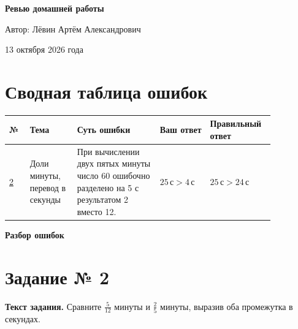 \documentclass[11pt,a4paper]{article}
\begin{document}
\thispagestyle{empty}
\vspace*{0.27\textheight}
\begin{center}
  {\Huge\bfseries Ревью домашней работы\par}
  \vspace{20mm}
  {\large Автор: Лёвин Артём Александрович\par}
  \vspace{6mm}
  {\large 13 октября 2026 года\par}
\end{center}
\vfill
\begin{center}
\end{center}
\newpage

\section*{Сводная таблица ошибок}
\small
\setlength{\tabcolsep}{3pt}
\begin{tabular}{@{}p{0.075\linewidth}p{0.16\linewidth}p{0.29\linewidth}p{0.17\linewidth}p{0.17\linewidth}@{}}
\toprule
\textbf{№} & \textbf{Тема} & \textbf{Суть ошибки} & \textbf{Ваш ответ} & \textbf{Правильный ответ} \\
\midrule
\hyperref[task:2]{2} & Доли минуты, перевод в секунды & При вычислении двух пятых минуты число 60 ошибочно разделено на 5 с результатом 2 вместо 12. & $25\,\text{с}>4\,\text{с}$ & $25\,\text{с}>24\,\text{с}$ \\
\bottomrule
\end{tabular}
\normalsize
\clearpage

\thispagestyle{empty}
\vspace*{\fill}
\begin{center}
  {\LARGE\bfseries Разбор ошибок}
\end{center}
\vspace*{\fill}
\clearpage

\label{task:2}
\section*{Задание № 2}

\textbf{Текст задания.} Сравните $\frac{5}{12}$ минуты и $\frac25$ минуты, выразив оба промежутка в секундах.
\end{document}
